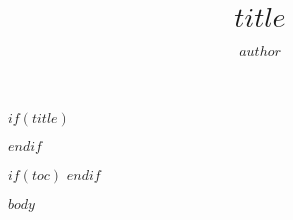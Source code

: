 \documentclass{$documentclass$}
\title{$title$}
\author{$author$}
\begin{document}
$if(title)$
\maketitle
$endif$

$if(toc)$
\tableofcontents
$endif$

$body$
\end{document}
